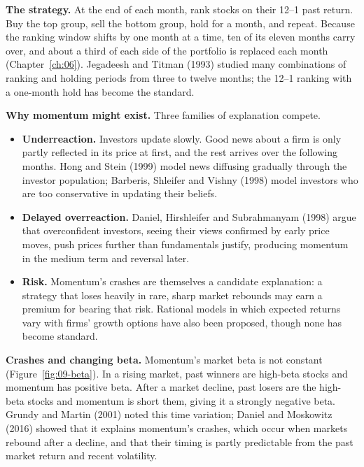 \textbf{The strategy.} At the end of each month, rank stocks on their 12--1 past return. Buy the top group, sell the bottom group, hold for a month, and repeat. Because the ranking window shifts by one month at a time, ten of its eleven months carry over, and about a third of each side of the portfolio is replaced each month (Chapter~\ref{ch:06}). Jegadeesh and Titman (1993) studied many combinations of ranking and holding periods from three to twelve months; the 12--1 ranking with a one-month hold has become the standard.

\textbf{Why momentum might exist.} Three families of explanation compete.

\begin{itemize}
  \item \textbf{Underreaction.} Investors update slowly. Good news about a firm is only partly reflected in its price at first, and the rest arrives over the following months. Hong and Stein (1999) model news diffusing gradually through the investor population; Barberis, Shleifer and Vishny (1998) model investors who are too conservative in updating their beliefs.
  \item \textbf{Delayed overreaction.} Daniel, Hirshleifer and Subrahmanyam (1998) argue that overconfident investors, seeing their views confirmed by early price moves, push prices further than fundamentals justify, producing momentum in the medium term and reversal later.
  \item \textbf{Risk.} Momentum's crashes are themselves a candidate explanation: a strategy that loses heavily in rare, sharp market rebounds may earn a premium for bearing that risk. Rational models in which expected returns vary with firms' growth options have also been proposed, though none has become standard.
\end{itemize}

\textbf{Crashes and changing beta.} Momentum's market beta is not constant (Figure~\ref{fig:09-beta}). In a rising market, past winners are high-beta stocks and momentum has positive beta. After a market decline, past losers are the high-beta stocks and momentum is short them, giving it a strongly negative beta. Grundy and Martin (2001) noted this time variation; Daniel and Moskowitz (2016) showed that it explains momentum's crashes, which occur when markets rebound after a decline, and that their timing is partly predictable from the past market return and recent volatility.

